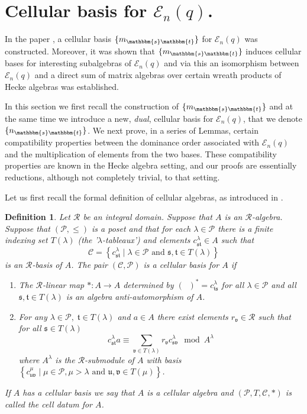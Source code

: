 \documentclass[10pt,a4,twoside,hidelinks,rm]{article}
\newcommand{\PP}{{\mathcal P}}
\newcommand\es{\mathbbm{s}}
\newcommand\et{\mathbbm{t}}
\newcommand{\s}{\mathfrak{s}}
\newcommand{\U}{\mathfrak{u}}
\newcommand{\V}{\mathfrak{v}}
\newcommand{\T}{\mathfrak{t}}
\newcommand{\E}{ {\mathcal E}_n(q)}
\theoremstyle{plain}
\newtheorem{defi}[teo]{Definition}%
\begin{document}
\section{Cellular basis for $\E$.}
In the paper \cite{ER}, a cellular basis $ \{ m_{\es\et} \} $ for $ \E $ was constructed.
Moreover, it was shown that $ \{ m_{\es\et} \} $ induces cellular bases for
interesting subalgebras of $ \E$ and via this an isomorphism between $ \E $ and a direct sum of matrix algebras
over certain wreath products of Hecke algebras was established.


\medskip
In this section we first recall the construction of $ \{ m_{\es\et} \} $ and at the same time
we introduce a new, \textit{dual}, cellular basis for $ \E$, that we denote $ \{ n_{\es\et} \} $.
We next prove,  in a series of Lemmas, certain compatibility properties between the 
dominance order associated with $ \E $ and the multiplication of elements from the
two bases. These compatibility properties are known in the Hecke algebra setting, and
our proofs are essentially reductions, although not completely trivial, to that setting. 


\medskip
Let us first recall the formal definition of cellular algebras, as introduced in \cite{GL}.
\begin{defi}{\label{cellular}} Let $\mathcal{R}$ be an integral domain. Suppose that $A$ is an
  $\mathcal{R}$-algebra. Suppose that $(\PP,\leq)$ is a poset
  and that for each $\lambda\in \PP$ there is a
finite indexing set $T(\lambda)$ (the '$\lambda$-tableaux') and elements $c_{\s\T}^{\lambda}\in
A$ such that
\begin{equation}
  \mathcal{C}=\left\{c_{\s\T}^{\lambda}\mid \lambda\in \PP \mbox{ and } \s,\T\in T(\lambda)\right\}
\end{equation}  
is an $\mathcal{R}$-basis of $A$. The pair $(\mathcal{C},\PP)$ is a
\textit{cellular basis} for $A$ if
\begin{enumerate}\renewcommand{\labelenumi}{\textbf{(\roman{enumi})}}
\item The $\mathcal{R}$-linear map $*:A\to A$ determined by
$(\mathop{c_{\s\T}^{\lambda}})^*=c_{\T\s}^{\lambda}$ for all
$\lambda\in\PP$ and all $\s,\T\in T(\lambda)$ is an algebra
anti-automorphism of $A$.

\item For any $\lambda\in \PP,\; \T\in T(\lambda)$ and $a\in A$
there exist elements $r_{\V}\in \mathcal{R}$ such that for all $\s\in T(\lambda)$
$$c_{\s\T}^{\lambda} a \equiv \sum_{\V\in T(\lambda)} r_{\V}c_{\s\V}^{\lambda} \mod{A^{\lambda}}$$
where $A^\lambda$ is the $\mathcal{R}$-submodule of $A$ with basis
$\left\{c_{\U\V}^{\mu}\mid \mu\in \PP,\mu>\lambda \mbox{ and }
\U,\V\in T(\mu)\right\}$.
\end{enumerate}
If $A$ has a cellular basis we say that $A$ is a \textit{cellular
algebra} and $(\PP,T,\mathcal{C},\ast)$ is called the \textit{cell datum} for $A$.
\end{defi}
\end{document}
